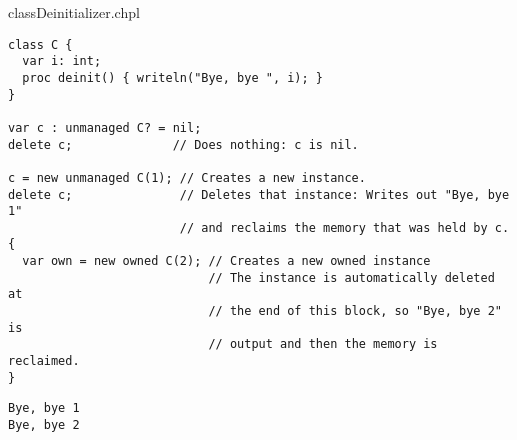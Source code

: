 \begin{chapelexample}{classDeinitializer.chpl}
\begin{chapel}
\begin{verbatim}
class C {
  var i: int;
  proc deinit() { writeln("Bye, bye ", i); }
}

var c : unmanaged C? = nil;
delete c;              // Does nothing: c is nil.

c = new unmanaged C(1); // Creates a new instance.
delete c;               // Deletes that instance: Writes out "Bye, bye 1"
                        // and reclaims the memory that was held by c.
{
  var own = new owned C(2); // Creates a new owned instance
                            // The instance is automatically deleted at
                            // the end of this block, so "Bye, bye 2" is
                            // output and then the memory is reclaimed.
}
\end{verbatim}
\end{chapel}
\begin{chapeloutput}
\begin{verbatim}
Bye, bye 1
Bye, bye 2
\end{verbatim}
\end{chapeloutput}
\end{chapelexample}
